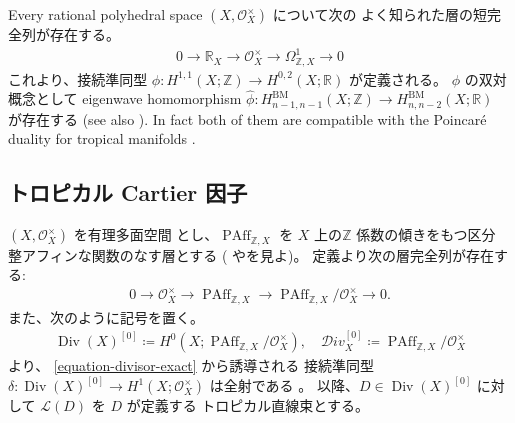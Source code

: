 \documentclass[a4paper,dvipdfmx,reqno,12pt]{amsart}
\theoremstyle{definition}
\newcommand{\deq}{\coloneqq}
\newcommand{\opn}[1]{\operatorname{#1}}
\numberwithin{equation}{section}
\begin{document}
Every rational polyhedral space $(X,\mathcal{O}_X^{\times})$
について次の
よく知られた層の短完全列が存在する。
\begin{align}
0\to \mathbb{R}_X \to 
\mathcal{O}_X^{\times} \to \Omega_{\mathbb{Z},X}^{1}\to 0
\end{align}
これより、接続準同型
$\phi \colon H^{1,1}(X;\mathbb{Z})
\to H^{0,2}(X;\mathbb{R})$ が定義される。
$\phi$ の双対概念として
eigenwave homomorphism
$\hat{\phi} \colon
H_{n-1,n-1}^{\mathrm{BM}}(X;\mathbb{Z})
\to H_{n,n-2}^{\mathrm{BM}}(X;\mathbb{R})$
が存在する \cite[(5.2)]{MR3330789}
(see also \cite[Definition 2.9]{MR3894860}).
In fact both of them are compatible with 
the Poincar\'e duality for tropical manifolds
\cite[Lemma 5.13]{MR3894860}.

\subsection{トロピカル Cartier 因子}

$(X,\mathcal{O}_X^{\times})$ を有理多面空間
とし、$\opn{PAff}_{\mathbb{Z},X}$ を
$X$ 上の$\mathbb{Z}$ 係数の傾きをもつ区分
整アフィンな関数のなす層とする
(\cite[Definition 4.1]{MR3894860}
や\cite[Definition 3.8 and Remark
3.9]{MR4246795}を見よ)。
定義より次の層完全列が存在する:
\begin{align}
\label{equation-divisor-exact}
0 \to  \mathcal{O}_X^{\times} 
\to \opn{PAff}_{\mathbb{Z},X} \to 
\opn{PAff}_{\mathbb{Z},X}/\mathcal{O}_X^{\times}
\to 0.
\end{align}
また、次のように記号を置く。
\begin{align}
\opn{Div}(X)^{[0]}\deq H^{0}(X;
\opn{PAff}_{\mathbb{Z},X}/\mathcal{O}_X^{\times}), 
\quad \mathcal{D}iv_X^{[0]}\deq \opn{PAff}_{\mathbb{Z},X}/\mathcal{O}_X^{\times}
\end{align}
\cite[Lemma 4.5]{MR3894860} より、
\eqref{equation-divisor-exact} から誘導される
接続準同型
$\delta \colon \opn{Div}(X)^{[0]}\to 
H^{1}(X;\mathcal{O}_X^{\times})$ は全射である
\cite[Proposition 4.6]{MR3894860}。
以降、$D\in \opn{Div}(X)^{[0]}$ に対して
$\mathcal{L}(D)$ を $D$ が定義する
トロピカル直線束とする。
\end{document}
